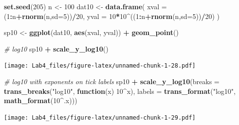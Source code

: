\documentclass[]{article}
\newenvironment{Shaded}{\begin{snugshade}}{\end{snugshade}}
\newcommand{\KeywordTok}[1]{\textcolor[rgb]{0.13,0.29,0.53}{\textbf{#1}}}
\newcommand{\DataTypeTok}[1]{\textcolor[rgb]{0.13,0.29,0.53}{#1}}
\newcommand{\DecValTok}[1]{\textcolor[rgb]{0.00,0.00,0.81}{#1}}
\newcommand{\StringTok}[1]{\textcolor[rgb]{0.31,0.60,0.02}{#1}}
\newcommand{\CommentTok}[1]{\textcolor[rgb]{0.56,0.35,0.01}{\textit{#1}}}
\newcommand{\ControlFlowTok}[1]{\textcolor[rgb]{0.13,0.29,0.53}{\textbf{#1}}}
\newcommand{\OperatorTok}[1]{\textcolor[rgb]{0.81,0.36,0.00}{\textbf{#1}}}
\newcommand{\NormalTok}[1]{#1}
\begin{document}
\begin{Shaded}
\begin{Highlighting}[]
\KeywordTok{set.seed}\NormalTok{(}\DecValTok{205}\NormalTok{)}
\NormalTok{n <-}\StringTok{ }\DecValTok{100}
\NormalTok{dat10 <-}\StringTok{ }\KeywordTok{data.frame}\NormalTok{(}
    \DataTypeTok{xval =}\NormalTok{ (}\DecValTok{1}\OperatorTok{:}\NormalTok{n}\OperatorTok{+}\KeywordTok{rnorm}\NormalTok{(n,}\DataTypeTok{sd=}\DecValTok{5}\NormalTok{))}\OperatorTok{/}\DecValTok{20}\NormalTok{,}
    \DataTypeTok{yval =} \DecValTok{10}\OperatorTok{*}\DecValTok{10}\OperatorTok{^}\NormalTok{((}\DecValTok{1}\OperatorTok{:}\NormalTok{n}\OperatorTok{+}\KeywordTok{rnorm}\NormalTok{(n,}\DataTypeTok{sd=}\DecValTok{5}\NormalTok{))}\OperatorTok{/}\DecValTok{20}\NormalTok{)}
\NormalTok{)}

\NormalTok{sp10 <-}\StringTok{ }\KeywordTok{ggplot}\NormalTok{(dat10, }\KeywordTok{aes}\NormalTok{(xval, yval)) }\OperatorTok{+}\StringTok{ }\KeywordTok{geom_point}\NormalTok{()}

\CommentTok{# log10}
\NormalTok{sp10 }\OperatorTok{+}\StringTok{ }\KeywordTok{scale_y_log10}\NormalTok{()}
\end{Highlighting}
\end{Shaded}

\texttt{[image: Lab4\_files/figure-latex/unnamed-chunk-1-28.pdf]}

\begin{Shaded}
\begin{Highlighting}[]
\CommentTok{# log10 with exponents on tick labels}
\NormalTok{sp10 }\OperatorTok{+}\StringTok{ }\KeywordTok{scale_y_log10}\NormalTok{(}\DataTypeTok{breaks =} \KeywordTok{trans_breaks}\NormalTok{(}\StringTok{"log10"}\NormalTok{, }\ControlFlowTok{function}\NormalTok{(x) }\DecValTok{10}\OperatorTok{^}\NormalTok{x),}
                     \DataTypeTok{labels =} \KeywordTok{trans_format}\NormalTok{(}\StringTok{"log10"}\NormalTok{, }\KeywordTok{math_format}\NormalTok{(}\DecValTok{10}\OperatorTok{^}\NormalTok{.x)))}
\end{Highlighting}
\end{Shaded}

\texttt{[image: Lab4\_files/figure-latex/unnamed-chunk-1-29.pdf]}
\end{document}
